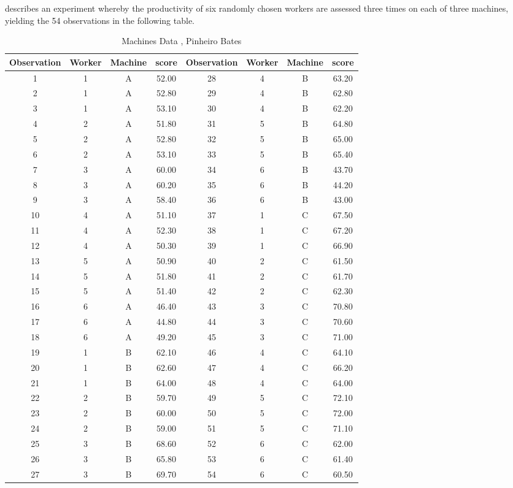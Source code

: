 \documentclass[12pt, a4paper]{report}
\theoremstyle{plain}
\theoremstyle{definition}
\theoremstyle{remark}
\begin{document}
\citet{PB} describes an experiment whereby the productivity of six
randomly chosen workers are assessed three times on each of three
machines, yielding the 54 observations in the following table.


\begin{table}[h!]
	\begin{center}
		\begin{tabular}{|c|c|c|c||c|c|c|c|}
			\hline
			Observation & Worker & Machine & score & Observation & Worker & Machine & score \\
			\hline
			1 & 1 & A & 52.00 &	28 & 4 & B & 63.20 \\
			2 & 1 & A & 52.80 &	  29 & 4 & B & 62.80 \\
			3 & 1 & A & 53.10 &	  30 & 4 & B & 62.20 \\
			4 & 2 & A & 51.80 &	  31 & 5 & B & 64.80 \\
			5 & 2 & A & 52.80 &	  32 & 5 & B & 65.00 \\
			6 & 2 & A & 53.10 &	  33 & 5 & B & 65.40 \\
			7 & 3 & A & 60.00 &	  34 & 6 & B & 43.70 \\
			8 & 3 & A & 60.20 &	  35 & 6 & B & 44.20 \\
			9 & 3 & A & 58.40 &	  36 & 6 & B & 43.00 \\
			10 & 4 & A & 51.10 &	  37 & 1 & C & 67.50 \\
			11 & 4 & A & 52.30 &	  38 & 1 & C & 67.20 \\
			12 & 4 & A & 50.30 &	  39 & 1 & C & 66.90 \\
			13 & 5 & A & 50.90 &	  40 & 2 & C & 61.50 \\
			14 & 5 & A & 51.80 &	  41 & 2 & C & 61.70 \\
			15 & 5 & A & 51.40 &	  42 & 2 & C & 62.30 \\
			16 & 6 & A & 46.40 &	  43 & 3 & C & 70.80 \\
			17 & 6 & A & 44.80 &	  44 & 3 & C & 70.60 \\
			18 & 6 & A & 49.20 &	  45 & 3 & C & 71.00 \\
			19 & 1 & B & 62.10 &	  46 & 4 & C & 64.10 \\
			20 & 1 & B & 62.60 &	  47 & 4 & C & 66.20 \\
			21 & 1 & B & 64.00 &	  48 & 4 & C & 64.00 \\
			22 & 2 & B & 59.70 &	  49 & 5 & C & 72.10 \\
			23 & 2 & B & 60.00 &	  50 & 5 & C & 72.00 \\
			24 & 2 & B & 59.00 &	  51 & 5 & C & 71.10 \\
			25 & 3 & B & 68.60 &	  52 & 6 & C & 62.00 \\
			26 & 3 & B & 65.80 &	  53 & 6 & C & 61.40 \\
			27 & 3 & B & 69.70 &	  54 & 6 & C & 60.50 \\
			
			\hline
		\end{tabular}
		\caption{Machines Data , Pinheiro Bates}
	\end{center}
\end{table}
\end{document}
